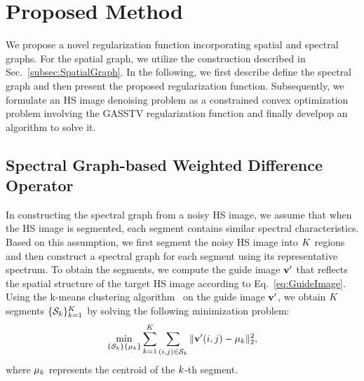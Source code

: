 \section{Proposed Method}
\label{sec:ProposedMethod}
We propose a novel regularization function incorporating spatial and spectral graphs. For the spatial graph, we utilize the construction described in Sec.~\ref{subsec:SpatialGraph}. In the following, we first describe define the spectral graph and then present the proposed regularization function. Subsequently, we formulate an HS image denoising problem as a constrained convex optimization problem involving the GASSTV regularization function and finally develpop an algorithm to solve it.


\subsection{Spectral Graph-based Weighted Difference Operator}
\label{subsec:WeightedSpectralDiff}
In constructing the spectral graph from a noisy HS image, we assume that when the HS image is segmented, each segment contains similar spectral characteristics. 
Based on this assumption, we first segment the noisy HS image into $K$ regions and then construct a spectral graph for each segment using its representative spectrum. To obtain the segments, we compute the guide image $\mathbf{v}{'}$ that reflects the spatial structure of the target HS image according to Eq.~\eqref{eq:GuideImage}. 
Using the k-means clustering algorithm~\cite{Arthur2006kmeans} on the guide image $\mathbf{v}{'}$, we obtain $K$ segments $\{\mathcal{S}_{k}\}_{k=1}^{K}$ by solving the following minimization problem:
\begin{equation}
    \label{eq:Segmentation}
    \min_{\{\mathcal{S}_{k}\} \{ \mu_{k} \}} \sum_{k = 1}^{K} \sum_{(i, j) \in \mathcal{S}_{k}} \| \mathbf{v}{'}(i, j) - \mu_{k} \|_{2}^{2},
\end{equation}
where $\mu_{k}$ represents the centroid of the $k$-th segment.
